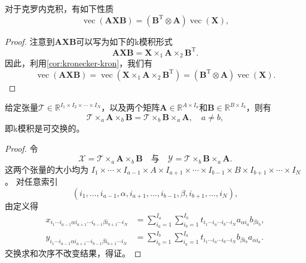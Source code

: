 \begin{corollary}\label{cor:kronecker-vec}
    对于克罗内克积，有如下性质
    \[
        \operatorname{vec}(\mathbf{A} \mathbf{X} \mathbf{B}) = (\mathbf{B}^{\mathrm{T}} \otimes \mathbf{A}) \operatorname{vec}(\mathbf{X}),
    \]
\end{corollary}
\begin{proof}
    注意到\( \mathbf{A} \mathbf{X} \mathbf{B} \)可以写为如下的k模积形式
    \[
        \mathbf{A} \mathbf{X} \mathbf{B} = \mathbf{X} \times_1 \mathbf{A} \times_2 \mathbf{B}^{\mathrm{T}}.
    \]
    因此，利用\cref{cor:kronecker-kron}，我们有
    \[
        \operatorname{vec}(\mathbf{A} \mathbf{X} \mathbf{B}) = \operatorname{vec}( \mathbf{X} \times_1 \mathbf{A} \times_2 \mathbf{B}^{\mathrm{T}}) = (\mathbf{B}^{\mathrm{T}} \otimes \mathbf{A}) \operatorname{vec}(\mathbf{X}).
    \]
\end{proof}

\begin{property}
    给定张量\( \mathcal{T} \in \mathbb{R}^{I_1 \times I_2 \times \cdots \times I_N} \)，以及两个矩阵\( \mathbf{A} \in \mathbb{R}^{A \times I_a} \)和\( \mathbf{B} \in \mathbb{R}^{B \times I_b} \)，则有
    \[
        \mathcal{T} \times_a \mathbf{A} \times_b \mathbf{B} = \mathcal{T} \times_b \mathbf{B} \times_a \mathbf{A}, \quad a \neq b,
    \]
    即k模积是可交换的。
\end{property}
\begin{proof}
    令
    \[
        \mathcal{X} = \mathcal{T}\times_a \mathbf{A}\times_b \mathbf{B}
        \quad\text{与}\quad
        \mathcal{Y} = \mathcal{T}\times_b \mathbf{B}\times_a \mathbf{A}.
    \]
    这两个张量的大小均为
    $I_1\times\cdots\times I_{a-1}\times A\times I_{a+1}\times\cdots\times
        I_{b-1}\times B\times I_{b+1}\times\cdots\times I_N$。
    对任意索引
    \[
        (i_1,\ldots,i_{a-1},\alpha, i_{a+1},\ldots,i_{b-1},\beta, i_{b+1},\ldots,i_N),
    \]
    由定义得
    \begin{align*}
        x_{i_1\cdots i_{a-1}\alpha i_{a+1}\cdots i_{b-1}\beta i_{b+1}\cdots i_N}
         & = \sum_{i_a=1}^{I_a}\sum_{i_b=1}^{I_b}
        t_{i_1\cdots i_a\cdots i_b\cdots i_N}
        a_{\alpha i_a}b_{\beta i_b},              \\
        y_{i_1\cdots i_{a-1}\alpha i_{a+1}\cdots i_{b-1}\beta i_{b+1}\cdots i_N}
         & = \sum_{i_b=1}^{I_b}\sum_{i_a=1}^{I_a}
        t_{i_1\cdots i_a\cdots i_b\cdots i_N}
        b_{\beta i_b}a_{\alpha i_a}.
    \end{align*}
    交换求和次序不改变结果，得证。
\end{proof}

